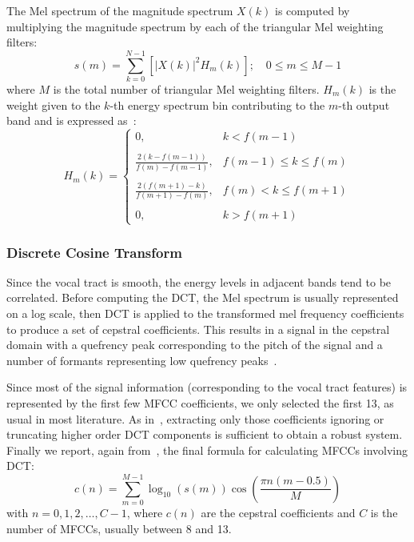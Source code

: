The Mel spectrum of the magnitude spectrum $X(k)$ is computed by multiplying the magnitude spectrum by each of the triangular Mel weighting filters:
\begin{equation}\label{eq:2}
s(m)=\sum_{k=0}^{N-1}\left[ \lvert X(k) \rvert ^{2} H_{m}(k)\right] ; \quad 0 \leq m \leq M-1
\end{equation}
where $M$ is the total number of triangular Mel weighting filters. $H_{m}(k)$ is the weight given to the $k$-th energy spectrum bin contributing to the $m$-th output band and is expressed as~\cite{rao:spectral}:
\begin{equation}
	H_{m}(k)=\left\{\begin{array}{cl}
	0, & k<f(m-1) \\ \\
	\frac{2(k-f(m-1))}{f(m)-f(m-1)}, & f(m-1) \leq k \leq f(m) \\ \\
	\frac{2(f(m+1)-k)}{f(m+1)-f(m)}, & f(m)<k \leq f(m+1) \\ \\
	0, & k>f(m+1)
	\end{array}\right.
\end{equation}

\subsubsection{Discrete Cosine Transform}

Since the vocal tract is smooth, the energy levels in adjacent bands tend to be correlated. Before computing the DCT, the Mel spectrum is usually represented on a log scale, then DCT is applied to the transformed mel frequency coefficients to produce a set of cepstral coefficients. This results in a signal in the cepstral domain with a quefrency peak corresponding to the pitch of the signal and a number of formants representing low quefrency peaks~\cite{rao:spectral}.

Since most of the signal information (corresponding to the vocal tract features) is represented by the first few MFCC coefficients, we only selected the first 13, as usual in most literature. As in~\cite{picone:signal_modeling}, extracting only those coefficients ignoring or truncating higher order DCT components is sufficient to obtain a robust system. Finally we report, again from~\cite{picone:signal_modeling}, the final formula for calculating MFCCs involving DCT:
\begin{equation}
	c(n)=\sum_{m=0}^{M-1} \log _{10}(s(m)) \cos \left(\frac{\pi n(m-0.5)}{M}\right)
\end{equation}
with $n=0,1,2, \ldots, C-1$, where $c(n)$ are the cepstral coefficients and $C$ is the number of MFCCs, usually between \num{8} and \num{13}.

